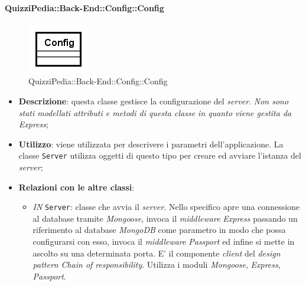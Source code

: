\paragraph{QuizziPedia::Back-End::Config::Config}
\label{QuizziPedia::Back-End::Config::Config}
\begin{figure}[ht]
	\centering
	\includegraphics[scale=0.8]{UML/Classi/Back-End/QuizziPedia_Back-End_Config_Config.png}
	\caption{QuizziPedia::Back-End::Config::Config}
	\end{figure}
\FloatBarrier
	\begin{itemize}
		\item \textbf{Descrizione}:
		questa classe gestisce la configurazione del \textit{server}. \textit{Non sono stati modellati attributi e metodi di questa classe in quanto viene gestita da Express};
		\item \textbf{Utilizzo}:
		viene utilizzata per descrivere i parametri dell'applicazione. La classe \texttt{Server} utilizza oggetti di questo tipo per creare ed avviare l'istanza del \textit{server};
		\item \textbf{Relazioni con le altre classi}:
		 \begin{itemize}
		 	\item \textit{IN} \texttt{Server}:
		 	classe che avvia il \textit{server}. Nello specifico apre una connessione al database tramite \textit{Mongoose}, invoca il \textit{middleware} \textit{Express} passando un riferimento al database \textit{MongoDB} come parametro in modo  che possa configurarsi con esso, invoca il \textit{middleware} \textit{Passport} ed infine si mette in ascolto su una determinata porta. E' il componente \textit{client} del \textit{design pattern} \textit{Chain of responsibility}. Utilizza i moduli \textit{Mongoose}, \textit{Express}, \textit{Passport}.
		 \end{itemize}
	\end{itemize}
